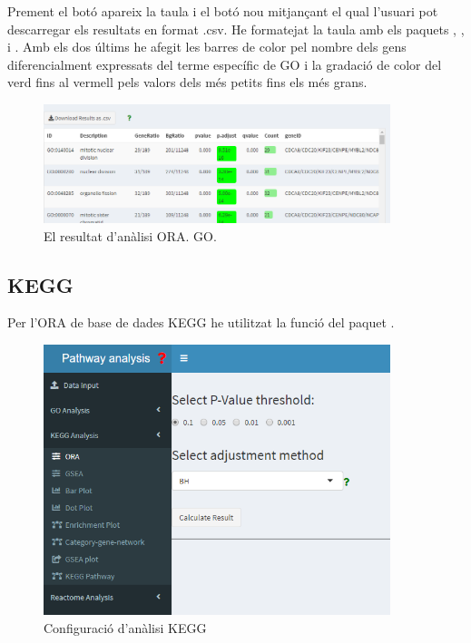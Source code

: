 Prement el botó apareix la taula i el botó nou mitjançant el qual l'usuari pot descarregar els resultats en format .csv. He formatejat la taula amb els paquets , ,  i . Amb els dos últims he afegit les barres de color pel nombre dels gens diferencialment expressats del terme específic de GO i la gradació de color del verd fins al vermell pels valors dels més petits fins els més grans. 

\begin{figure}[h!]
\centering
\includegraphics[width=0.9\textwidth]{figures/App_F6_Items_GO_ORA_Table.png} 
\caption{El resultat d'anàlisi ORA. GO.}
\end{figure}


\subsection{KEGG}

Per l'ORA de base de dades KEGG he utilitzat la funció  del paquet . 



\begin{figure}[H]
\centering
\includegraphics[width=0.9\textwidth]{figures/App_F7_Items_KEGG_ORA.png} 
\caption{Configuració d'anàlisi KEGG}
\end{figure}



